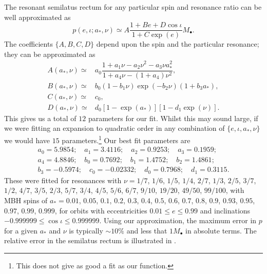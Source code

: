 The resonant semilatus rectum for any particular spin and resonance ratio can be well approximated as
\begin{equation}
p(e,\iota;a_\ast,\nu) \simeq A\dfrac{1 + B e + D \cos\iota}{1 + C\exp(e)} M_\bullet.
\end{equation}
The coefficients $\{A,B,C,D\}$ depend upon the spin and the particular resonance; they can be approximated as
\begin{align} 
A(a_\ast,\nu) \simeq {} & a_0\dfrac{1 + a_1\nu - a_2 \nu^2 - a_3 \nu a_\ast^2}{1 + a_4\nu - (1 + a_4)\nu^2}, \\
B(a_\ast,\nu) \simeq {} & b_0(1 - b_1\nu)\exp(-b_2\nu)(1 + b_3 a_\ast), \\
C(a_\ast,\nu) \simeq {} & c_0, \\
D(a_\ast,\nu) \simeq {} & d_0\left[1 - \exp(a_\ast)\right]\left[1 - d_1\exp(\nu)\right].
\end{align}
This gives us a total of $12$ parameters for our fit. Whilst this may sound large, if we were fitting an expansion to quadratic order in any combination of $\{e,\iota,a_\ast,\nu\}$ we would have $15$ parameters.\footnote{This does not give as good a fit as our function.} Our best fit parameters are
\begin{equation}
\begin{array}{c}
a_0 = 5.9854; \quad a_1 = 3.4116; \quad a_2 = 0.9253; \quad a_3 = 0.1959; \\
a_4 = 4.8846; \quad b_0 = 0.7692; \quad b_1 = 1.4752; \quad b_2 = 1.4861; \\
b_3 = -0.5974; \quad c_0 = -0.02332; \quad d_0 = 0.7968; \quad d_1 = 0.3115.\end{array}
\end{equation} 
These were fitted for resonances with $\nu = 1/7$, $1/6$, $1/5$, $1/4$, $2/7$, $1/3$, $2/5$, $3/7$, $1/2$, $4/7$, $3/5$, $2/3$, $5/7$, $3/4$, $4/5$, $5/6$, $6/7$, $9/10$, $19/20$, $49/50$, $99/100$, with MBH spins of $a_\ast = 0.01$, $0.05$, $0.1$, $0.2$, $0.3$, $0.4$, $0.5$, $0.6$, $0.7$, $0.8$, $0.9$, $0.93$, $0.95$, $0.97$, $0.99$, $0.999$, for orbits with eccentricities $0.01 \leq e \leq 0.99$ and inclinations $-0.999999 \leq \cos\iota \leq 0.999999$. Using our approximation, the maximum error in $p$ for a given $a_\ast$ and $\nu$ is typically $\sim10\%$ and less that $1 M_\bullet$ in absolute terms. The relative error in the semilatus rectum is illustrated in . 
